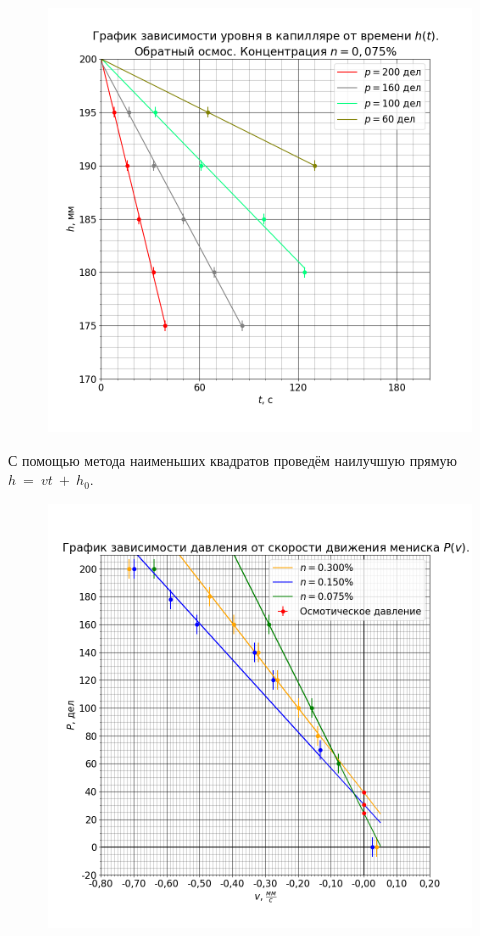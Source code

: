 \begin{figure}[H]
	\centering
	\includegraphics[width=1 \textwidth]{../plots/graph h_t n0.075 reverse.png}
\end{figure}

С помощью метода наименьших квадратов проведём наилучшую прямую $h~=~vt~+~h_0$.




\begin{figure}[H]
	\centering
	\includegraphics[width = 0.9 \textwidth]{../plots/graph_p_v.png}
\end{figure}

